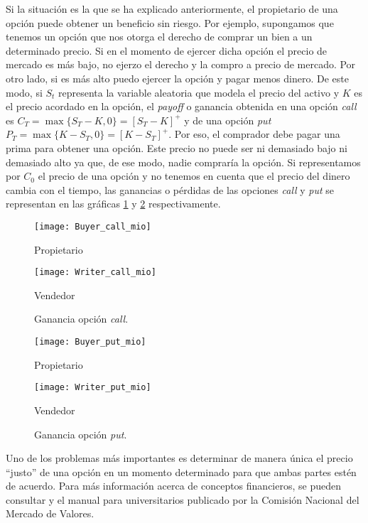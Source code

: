 Si la situación es la que se ha explicado anteriormente, el propietario de una opción puede obtener un beneficio sin riesgo. Por ejemplo, supongamos que tenemos un opción que nos otorga el derecho de comprar un bien a un determinado precio. Si en el momento de ejercer dicha opción el precio de mercado es más bajo, no ejerzo el derecho y la compro a precio de mercado. Por otro lado, si es más alto puedo ejercer la opción y pagar menos dinero. De este modo, si $ S_t $ representa la variable aleatoria que modela el precio del activo y $ K $ es el precio acordado en la opción, el \textit{payoff} o ganancia obtenida en una opción \textit{call} es $ C_T = \max\{S_T-K, 0\} = \left[S_T - K\right]^+ $ y de una opción \textit{put} $ P_T = \max\{K-S_T, 0\} = \left[K-S_T\right]^+ $. Por eso, el comprador debe pagar una prima para obtener una opción. Este precio no puede ser ni demasiado bajo ni demasiado alto ya que, de ese modo, nadie compraría la opción. Si representamos por $ C_0 $ el precio de una opción y no tenemos en cuenta que el precio del dinero cambia con el tiempo, las ganancias o pérdidas de las opciones \textit{call} y \textit{put} se representan en las gráficas \ref{graphCall} y \ref{graphPut} respectivamente.  \\

\begin{figure}[h!]
	\begin{minipage}{0.5\textwidth}
		\centering
		\texttt{[image: Buyer\_call\_mio]} 
		\caption*{Propietario}
	\end{minipage}
	\begin{minipage}{0.5\textwidth}
		\texttt{[image: Writer\_call\_mio]}
		\caption*{Vendedor}
		
	\end{minipage}
	\caption{Ganancia opción \textit{call}.}
	\label{graphCall}
\end{figure}

\begin{figure}[h!]
	
	\begin{minipage}{0.5\textwidth}
		\centering
		\texttt{[image: Buyer\_put\_mio]} 
		\caption*{Propietario}
	\end{minipage}
	\begin{minipage}{0.5\textwidth}
		\texttt{[image: Writer\_put\_mio]}
		\caption*{Vendedor}
		
	\end{minipage}
	\caption{Ganancia opción \textit{put}.}
	\label{graphPut}
\end{figure} 
Uno de los problemas más importantes es determinar de manera única el precio ``justo'' de una opción en un momento determinado para que ambas partes estén de acuerdo. Para más información acerca de conceptos financieros, se pueden consultar \cite{elliot1999mathematics} y el manual para universitarios publicado por la Comisión Nacional del Mercado de Valores.\\
